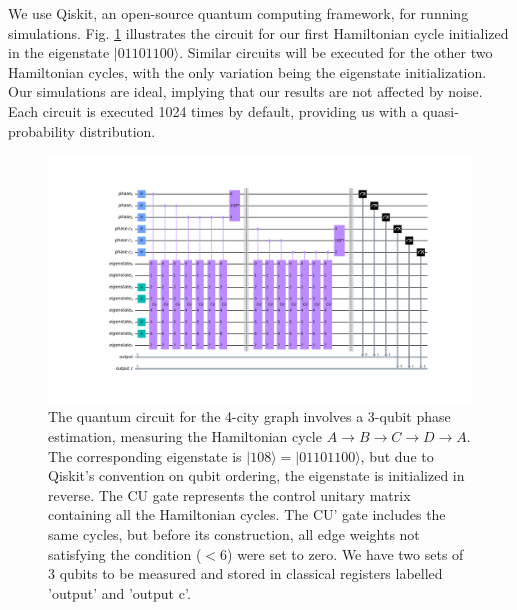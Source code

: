 \documentclass[msc,oneside]{ubcthesis}
\begin{document}
	We use Qiskit, an open-source quantum computing framework, for running simulations. Fig. \ref{fig:4-city-circuit} illustrates the circuit for our first Hamiltonian cycle initialized in the eigenstate $|01101100\rangle$. Similar circuits will be executed for the other two Hamiltonian cycles, with the only variation being the eigenstate initialization. Our simulations are ideal, implying that our results are not affected by noise. Each circuit is executed 1024 times by default, providing us with a quasi-probability distribution.
	


 \begin{figure}[!h]
		\centering
		\includegraphics[trim={8.5cm 4.4cm 6cm 4.4cm},clip, width=1 \linewidth]{"graphics/4-city-1-cycle-constrained-barrier"}
		\caption{The quantum circuit for the 4-city graph involves a 3-qubit phase estimation, measuring the Hamiltonian cycle $A \rightarrow B \rightarrow C \rightarrow D \rightarrow A$. The corresponding eigenstate is $|108\rangle = |01101100\rangle$, but due to Qiskit's convention on qubit ordering, the eigenstate is initialized in reverse. The CU gate represents the control unitary matrix containing all the Hamiltonian cycles. The CU' gate includes the same cycles, but before its construction, all edge weights not satisfying the condition ($< 6$) were set to zero. We have two sets of 3 qubits to be measured and stored in classical registers labelled 'output' and 'output c'.}
		\label{fig:4-city-circuit}
	\end{figure}		
\end{document}
